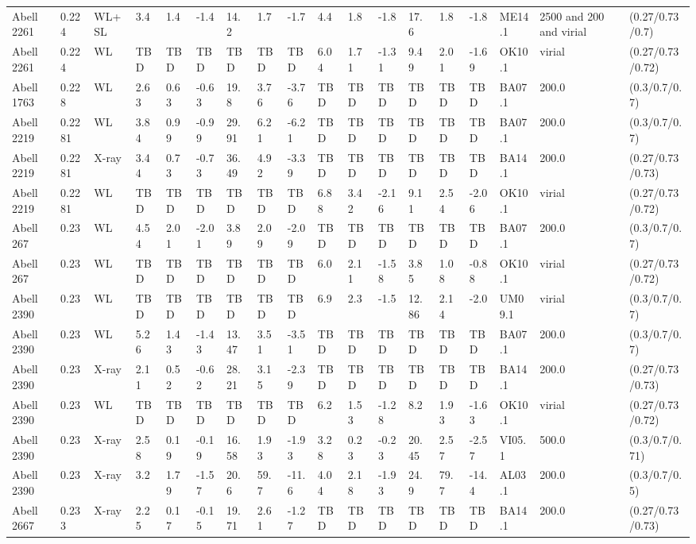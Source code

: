 \documentclass{article}
\begin{document}
\begin{center}
\begin{landscape}
\begin{longtable}{llllllllllllllllll}
Abell 2261 & 0.224 & WL+SL & 3.4 & 1.4 & -1.4 & 14.2 & 1.7 & -1.7 & 4.4 & 1.8 & -1.8 & 17.6 & 1.8 & -1.8 & ME14.1 & 2500 and 200 and virial & (0.27/0.73/0.7) \\
Abell 2261 & 0.224 & WL & TBD & TBD & TBD & TBD & TBD & TBD & 6.04 & 1.71 & -1.31 & 9.49 & 2.01 & -1.69 & OK10.1 & virial & (0.27/0.73/0.72) \\
Abell 1763 & 0.228 & WL & 2.63 & 0.63 & -0.63 & 19.8 & 3.76 & -3.76 & TBD & TBD & TBD & TBD & TBD & TBD & BA07.1 & 200.0 & (0.3/0.7/0.7) \\
Abell 2219 & 0.2281 & WL & 3.84 & 0.99 & -0.99 & 29.91 & 6.21 & -6.21 & TBD & TBD & TBD & TBD & TBD & TBD & BA07.1 & 200.0 & (0.3/0.7/0.7) \\
Abell 2219 & 0.2281 & X-ray & 3.44 & 0.73 & -0.73 & 36.49 & 4.92 & -3.39 & TBD & TBD & TBD & TBD & TBD & TBD & BA14.1 & 200.0 & (0.27/0.73/0.73) \\
Abell 2219 & 0.2281 & WL & TBD & TBD & TBD & TBD & TBD & TBD & 6.88 & 3.42 & -2.16 & 9.11 & 2.54 & -2.06 & OK10.1 & virial & (0.27/0.73/0.72) \\
Abell 267 & 0.23 & WL & 4.54 & 2.01 & -2.01 & 3.89 & 2.09 & -2.09 & TBD & TBD & TBD & TBD & TBD & TBD & BA07.1 & 200.0 & (0.3/0.7/0.7) \\
Abell 267 & 0.23 & WL & TBD & TBD & TBD & TBD & TBD & TBD & 6.0 & 2.11 & -1.58 & 3.85 & 1.08 & -0.88 & OK10.1 & virial & (0.27/0.73/0.72) \\
Abell 2390 & 0.23 & WL & TBD & TBD & TBD & TBD & TBD & TBD & 6.9 & 2.3 & -1.5 & 12.86 & 2.14 & -2.0 & UM09.1 & virial & (0.3/0.7/0.7) \\
Abell 2390 & 0.23 & WL & 5.26 & 1.43 & -1.43 & 13.47 & 3.51 & -3.51 & TBD & TBD & TBD & TBD & TBD & TBD & BA07.1 & 200.0 & (0.3/0.7/0.7) \\
Abell 2390 & 0.23 & X-ray & 2.11 & 0.52 & -0.62 & 28.21 & 3.15 & -2.39 & TBD & TBD & TBD & TBD & TBD & TBD & BA14.1 & 200.0 & (0.27/0.73/0.73) \\
Abell 2390 & 0.23 & WL & TBD & TBD & TBD & TBD & TBD & TBD & 6.2 & 1.53 & -1.28 & 8.2 & 1.93 & -1.63 & OK10.1 & virial & (0.27/0.73/0.72) \\
Abell 2390 & 0.23 & X-ray & 2.58 & 0.19 & -0.19 & 16.58 & 1.93 & -1.93 & 3.28 & 0.23 & -0.23 & 20.45 & 2.57 & -2.57 & VI05.1 & 500.0 & (0.3/0.7/0.71) \\
Abell 2390 & 0.23 & X-ray & 3.2 & 1.79 & -1.57 & 20.6 & 59.7 & -11.6 & 4.04 & 2.18 & -1.93 & 24.9 & 79.7 & -14.4 & AL03.1 & 200.0 & (0.3/0.7/0.5) \\
Abell 2667 & 0.233 & X-ray & 2.25 & 0.17 & -0.15 & 19.71 & 2.61 & -1.27 & TBD & TBD & TBD & TBD & TBD & TBD & BA14.1 & 200.0 & (0.27/0.73/0.73) \\

\end{longtable}
\end{landscape}
\end{center}
\end{document}
